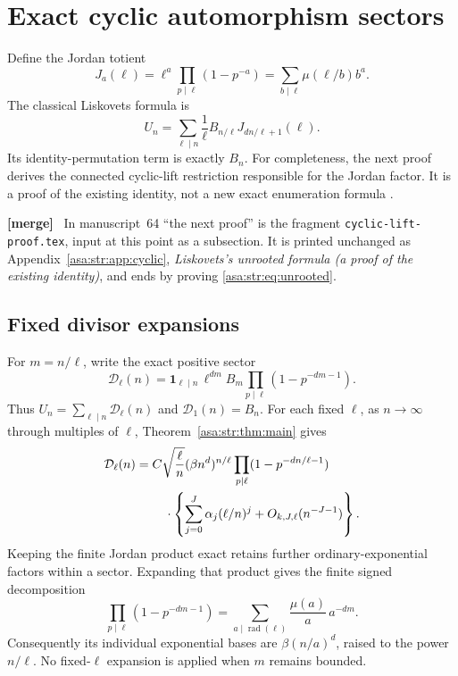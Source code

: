 \documentclass[11pt,letterpaper]{article}
\theoremstyle{remark}\newtheorem{remark}[theorem]{Remark}
\numberwithin{equation}{section}
\newcommand{\ind}{\mathbf 1}\newcommand{\fall}[2]{(#1)_{\underline{#2}}}
\DeclareMathOperator{\rad}{rad}
\newenvironment{mergenote}{\par\smallskip\begingroup\small
 \noindent\textbf{[merge]}\ }{\par\endgroup\smallskip}
\begin{document}
\section{Exact cyclic automorphism sectors}\label{asa:str:sec:sectors}
Define the Jordan totient
\[
 J_a(\ell)=\ell^a\prod_{p\mid\ell}(1-p^{-a})
 =\sum_{b\mid\ell}\mu(\ell/b)b^a.
\]
The classical Liskovets formula is
\begin{equation}\label{asa:str:eq:unrooted}
 U_n=\sum_{\ell\mid n}\frac1\ell B_{n/\ell}J_{dn/\ell+1}(\ell).
\end{equation}
Its identity-permutation term is exactly $B_n$. For completeness, the next proof derives the connected cyclic-lift restriction responsible for the Jordan factor. It is a proof of the existing identity, not a new exact enumeration formula \cite{L71,L98}.
\begin{mergenote}
In manuscript~64 ``the next proof'' is the fragment
\texttt{cyclic-lift-proof.tex}, input at this point as a subsection. It is
printed unchanged as Appendix~\ref{asa:str:app:cyclic}, \emph{Liskovets's
unrooted formula (a proof of the existing identity)}, and ends by proving
\eqref{asa:str:eq:unrooted}.
\end{mergenote}

\subsection{Fixed divisor expansions}
For $m=n/\ell$, write the exact positive sector
\begin{equation}\label{asa:str:eq:sector}
 \mathcal D_\ell(n)=\ind_{\ell\mid n}\,
 \ell^{dm}B_m\prod_{p\mid\ell}(1-p^{-dm-1}).
\end{equation}
Thus $U_n=\sum_{\ell\mid n}\mathcal D_\ell(n)$ and $\mathcal D_1(n)=B_n$.
For each fixed $\ell$, as $n\to\infty$ through multiples of $\ell$, Theorem~\ref{asa:str:thm:main} gives
\begin{align}
 \mathcal D_\ell(n)={}&C\sqrt{\frac\ell n}(\beta n^d)^{n/\ell}
 \prod_{p\mid\ell}(1-p^{-dn/\ell-1})\notag\\
 &\quad\cdot\left\{\sum_{j=0}^J\alpha_j(\ell/n)^j
                 +O_{k,J,\ell}(n^{-J-1})\right\}.\label{asa:str:eq:sectorasymp}
\end{align}
Keeping the finite Jordan product exact retains further ordinary-exponential factors within a sector. Expanding that product gives the finite signed decomposition
\[
 \prod_{p\mid\ell}(1-p^{-dm-1})
 =\sum_{a\mid\rad(\ell)}\frac{\mu(a)}a\,a^{-dm}.
\]
Consequently its individual exponential bases are $\beta(n/a)^d$, raised to the power $n/\ell$. No fixed-$\ell$ expansion is applied when $m$ remains bounded.
\end{document}
